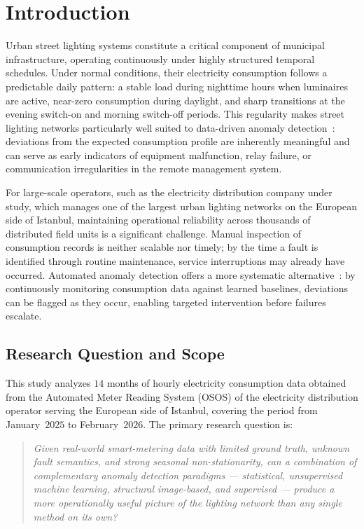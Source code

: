 \documentclass{article}
\begin{document}
\section{Introduction}
Urban street lighting systems constitute a critical component of municipal infrastructure, operating continuously under highly structured temporal schedules. Under normal conditions, their electricity consumption follows a predictable daily pattern: a stable load during nighttime hours when luminaires are active, near-zero consumption during daylight, and sharp transitions at the evening switch-on and morning switch-off periods. This regularity makes street lighting networks particularly well suited to data-driven anomaly detection~\cite{nespoli2024street,ptacek2022road}: deviations from the expected consumption profile are inherently meaningful and can serve as early indicators of equipment malfunction, relay failure, or communication irregularities in the remote management system.

For large-scale operators, such as the electricity distribution company under study, which manages one of the largest urban lighting networks on the European side of Istanbul, maintaining operational reliability across thousands of distributed field units is a significant challenge. Manual inspection of consumption records is neither scalable nor timely; by the time a fault is identified through routine maintenance, service interruptions may already have occurred. Automated anomaly detection offers a more systematic alternative~\cite{himeur2021survey,wang2020review}: by continuously monitoring consumption data against learned baselines, deviations can be flagged as they occur, enabling targeted intervention before failures escalate.

\subsection*{Research Question and Scope}
This study analyzes $14$ months of hourly electricity consumption data obtained from the Automated Meter Reading System (OSOS) of the electricity distribution operator serving the European side of Istanbul, covering the period from January~$2025$ to February~$2026$. The primary research question is:
 
\begin{quote}
\emph{Given real-world smart-metering data with limited ground truth, unknown fault semantics, and strong seasonal non-stationarity, can a combination of complementary anomaly detection paradigms --- statistical, unsupervised machine learning, structural image-based, and supervised --- produce a more operationally useful picture of the lighting network than any single method on its own?}
\end{quote}
\end{document}
